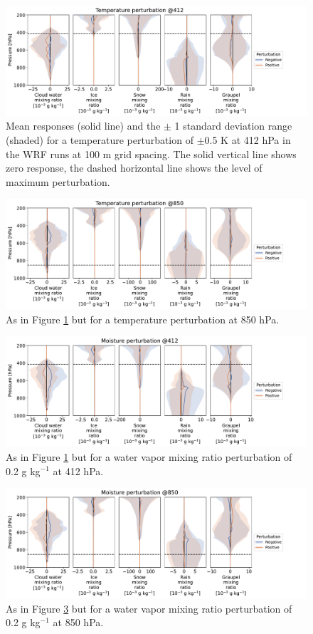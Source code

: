 \documentclass[draft]{agujournal2019}
\begin{document}
\begin{figure}[pth]
    \noindent\includegraphics[width=\textwidth]{figures/pert_var_T_0.5_@412}
    \caption{Mean responses (solid line) and the $\pm$ 1 standard deviation range (shaded) for a temperature perturbation of $\pm$0.5 K at 412 hPa in the WRF runs at 100 m grid spacing. The solid vertical line shows zero response, the dashed horizontal line shows the level of maximum perturbation.}
    \label{fig:var_T_412}
\end{figure}

\begin{figure}[pth]
    \noindent\includegraphics[width=\textwidth]{figures/pert_var_T_0.5_@850}
    \caption{As in Figure \ref{fig:var_T_412} but for a temperature perturbation at 850 hPa.}
    \label{fig:var_T_850}
\end{figure}

\begin{figure}[pth]
    \noindent\includegraphics[width=\textwidth]{figures/pert_var_q_0.0002_@412}
    \caption{As in Figure \ref{fig:var_T_412} but for a water vapor mixing ratio
    perturbation of 0.2 g kg$^{-1}$ at 412 hPa.}
    \label{fig:var_q_412}
\end{figure}

\begin{figure}[pth]
    \noindent\includegraphics[width=\textwidth]{figures/pert_var_q_0.0002_@850}
    \caption{As in Figure \ref{fig:var_q_412} but for a water vapor mixing ratio perturbation of 0.2 g kg$^{-1}$ at 850 hPa.}
    \label{fig:var_q_850}
\end{figure}
\end{document}
